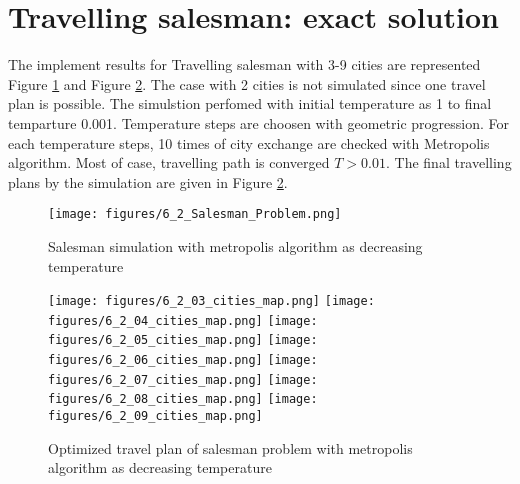 \documentclass[paper=a4, fontsize=11pt]{scrartcl} %
\numberwithin{equation}{section} %
\numberwithin{figure}{section} %
\numberwithin{table}{section} %
\begin{document}
\FloatBarrier 
\section{Travelling salesman: exact solution}
The implement results for Travelling salesman with 3-9 cities are represented Figure \ref{fig2-1} and Figure \ref{fig2-2}. The case with 2  cities is not simulated since one travel plan is possible. The simulstion perfomed with initial temperature as 1 to final temparture 0.001. Temperature steps are choosen with geometric progression. For each temperature steps, 10 times of city exchange are checked with  Metropolis algorithm. Most of case, travelling path is converged $T > 0.01$. The final travelling plans by the simulation are given in Figure \ref{fig2-2}. 


\begin{figure}[ht]
  \centering
  \texttt{[image: figures/6\_2\_Salesman\_Problem.png]}
  \caption{Salesman simulation with metropolis algorithm as decreasing temperature }
  \label{fig2-1}
\end{figure}

\begin{figure}[ht]
  \centering
  \texttt{[image: figures/6\_2\_03\_cities\_map.png]}
  \texttt{[image: figures/6\_2\_04\_cities\_map.png]}
  \texttt{[image: figures/6\_2\_05\_cities\_map.png]}
  \texttt{[image: figures/6\_2\_06\_cities\_map.png]}
  \texttt{[image: figures/6\_2\_07\_cities\_map.png]}
  \texttt{[image: figures/6\_2\_08\_cities\_map.png]}
  \texttt{[image: figures/6\_2\_09\_cities\_map.png]}
  \caption{Optimized travel plan of salesman problem with metropolis algorithm as decreasing temperature}
  \label{fig2-2}
\end{figure}
\end{document}
